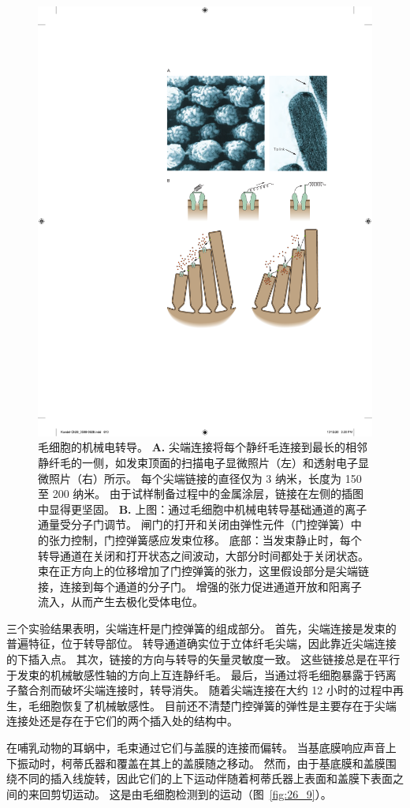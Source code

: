 \begin{figure}[htbp]
	\centering
	\includegraphics[width=0.5\linewidth]{chap26/fig_26_8}
	\caption{毛细胞的机械电转导。
		\textbf{A.} 尖端连接将每个静纤毛连接到最长的相邻静纤毛的一侧，如发束顶面的扫描电子显微照片（左）和透射电子显微照片（右）所示。
		每个尖端链接的直径仅为 3 纳米，长度为 150 至 200 纳米。
		由于试样制备过程中的金属涂层，链接在左侧的插图中显得更坚固\cite{assad1991tip,hudspeth1994pulling}。
		\textbf{B.} 上图：通过毛细胞中机械电转导基础通道的离子通量受分子门调节。
		闸门的打开和关闭由弹性元件（门控弹簧）中的张力控制，门控弹簧感应发束位移\cite{howard1988compliance}。
		底部：当发束静止时，每个转导通道在关闭和打开状态之间波动，大部分时间都处于关闭状态。
		束在正方向上的位移增加了门控弹簧的张力，这里假设部分是尖端链接，连接到每个通道的分子门。
		增强的张力促进通道开放和阳离子流入，从而产生去极化受体电位\cite{hudspeth1989ear}。}
	\label{fig:26_8}
\end{figure}


三个实验结果表明，尖端连杆是门控弹簧的组成部分。
首先，尖端连接是发束的普遍特征，位于转导部位。
转导通道确实位于立体纤毛尖端，因此靠近尖端连接的下插入点。
其次，链接的方向与转导的矢量灵敏度一致。
这些链接总是在平行于发束的机械敏感性轴的方向上互连静纤毛。
最后，当通过将毛细胞暴露于钙离子螯合剂而破坏尖端连接时，转导消失。
随着尖端连接在大约 12 小时的过程中再生，毛细胞恢复了机械敏感性。
目前还不清楚门控弹簧的弹性是主要存在于尖端连接处还是存在于它们的两个插入处的结构中。


在哺乳动物的耳蜗中，毛束通过它们与盖膜的连接而偏转。
当基底膜响应声音上下振动时，柯蒂氏器和覆盖在其上的盖膜随之移动。
然而，由于基底膜和盖膜围绕不同的插入线旋转，因此它们的上下运动伴随着柯蒂氏器上表面和盖膜下表面之间的来回剪切运动。
这是由毛细胞检测到的运动（图~\ref{fig:26_9}）。


